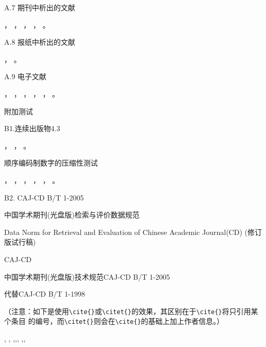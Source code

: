 A.7 期刊中析出的文献

，
，
，
，
。

A.8 报纸中析出的文献

，
。

A.9 电子文献

，
，
，
，
，
。

附加测试

B1.连续出版物4.3

，
，
。

顺序编码制数字的压缩性测试

，
，
，
，
，
。

B2. CAJ-CD B/T 1-2005

中国学术期刊(光盘版)检索与评价数据规范

Data Norm for Retrieval and Evaluation of Chinese Academic Journal(CD) (修订版试行稿)

CAJ-CD

中国学术期刊(光盘版)技术规范CAJ-CD B/T 1-2005

代替CAJ-CD B/T 1-1998

（注意：如下是使用\verb|\cite{}|或\verb|\citet{}|的效果，其区别在于\verb|\cite{}|将只引用某个条目
的编号，而\verb|\citet{}|则会在\verb|\cite{}|的基础上加上作者信息。）

\citet[12]{zhuyixuan1985},
\cite{yejianying1946},
\cite{gwywgzjj1958},\cite{shenkuogwywgzjj1070},\cite{jiyun1800},
\citet{liujiang2004},\citet{wanjingkun1996},\citet{dai1983}